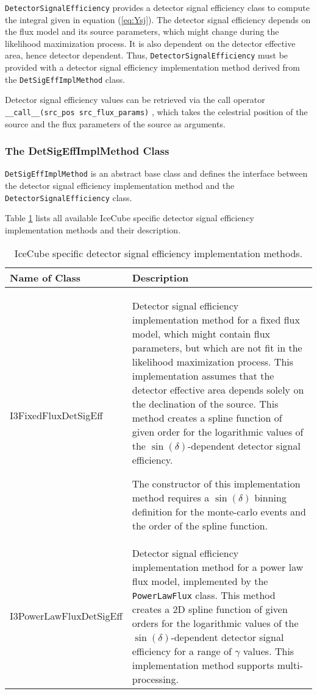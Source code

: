 \documentclass{article}
\newcommand{\eq}[1]{(\ref{#1})}
\newcommand{\code}[1]{\texttt{#1}}
\newcommand{\class}[1]{\colorbox{blue!30}{\code{#1}}}
\begin{document}
\class{DetectorSignalEfficiency} provides a detector signal efficiency class to
compute the integral given in equation \eq{eq:Ysj}. The detector signal
efficiency depends on the flux model and its source parameters, which might
change during the likelihood maximization process. It is also dependent on the
detector effective area, hence detector dependent. Thus,
\class{DetectorSignalEfficiency} must be provided with a detector signal
efficiency implementation method derived from the \class{DetSigEffImplMethod}
class.

Detector signal efficiency values can be retrieved via the call operator
\code{\_\_call\_\_(src\_pos src\_flux\_params)} , which takes the celestrial position of the
source and the flux parameters of the source as arguments.

\subsubsection{The DetSigEffImplMethod Class}

\class{DetSigEffImplMethod} is an abstract base class and defines the interface
between the detector signal efficiency implementation method and the
\class{DetectorSignalEfficiency} class.

Table \ref{tbl:I3DetSigEffImplMethod} lists all available IceCube specific
detector signal efficiency implementation methods and their description.
\begin{table}
\caption{IceCube specific detector signal efficiency implementation methods.}
\label{tbl:I3DetSigEffImplMethod}

\begin{tabular}{l | p{10cm}}
\hline
Name of Class & Description \\
\hline
I3FixedFluxDetSigEff & Detector signal efficiency implementation method for a
    fixed flux model, which might contain flux parameters, but which
    are not fit in the likelihood maximization process.
    This implementation assumes that the detector effective
    area depends solely on the declination of the source. This method creates
    a spline function of given order for the logarithmic values of the
    $\sin(\delta)$-dependent detector signal efficiency.

    The constructor of this implementation method requires a $\sin(\delta)$
    binning definition for the monte-carlo events and the order of the spline
    function.\\
I3PowerLawFluxDetSigEff & Detector signal efficiency implementation method for a
    power law flux model, implemented by the \class{PowerLawFlux} class.
    This method creates a 2D spline function of given orders for the logarithmic
    values of the $\sin(\delta)$-dependent detector signal efficiency for a
    range of $\gamma$ values. This implementation method supports
    multi-processing.
\end{tabular}
\end{table}
\end{document}

